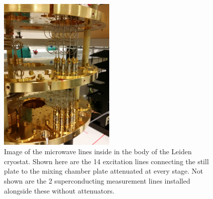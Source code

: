 \begin{figure}
\centering
\includegraphics[angle=-90,width = 0.5\textwidth]{figures/appendix/cryostats/Leiden_lines.jpg}
\caption{Image of the microwave lines inside in the body of the Leiden cryostat. Shown here are the 14 excitation lines connecting the still plate to the mixing chamber plate attenuated at every stage. Not shown are the 2 superconducting measurement lines installed alongside these without attenuators.}
\label{Fig:Appen:Leiden_lines}
\end{figure}

